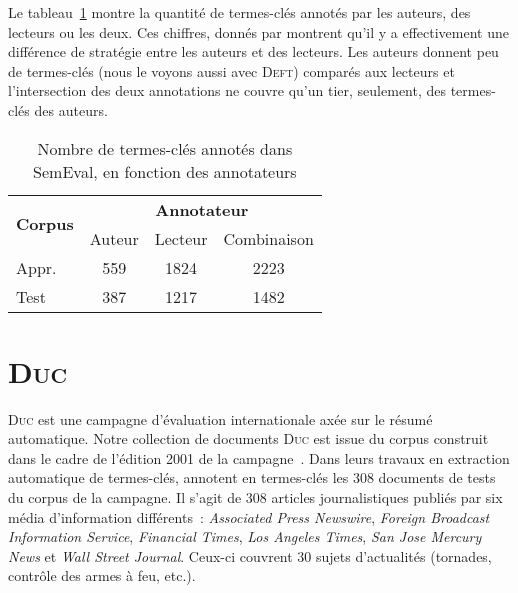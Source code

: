     Le tableau~\ref{tab:semeval_annotators} montre la quantité de termes-clés
    annotés par les auteurs, des lecteurs ou les deux. Ces chiffres, donnés par
     montrent qu'il y a effectivement une différence de
    stratégie entre les auteurs et des lecteurs. Les auteurs donnent peu de
    termes-clés (nous le voyons aussi avec \textsc{Deft}) comparés aux lecteurs
    et l'intersection des deux annotations ne couvre qu'un tier, seulement, des
    termes-clés des auteurs. 

    \begin{table}[!h]
      \centering
      \begin{tabular}{l|ccc}
        \toprule
        \multirow{2}{*}{\textbf{Corpus}} & \multicolumn{3}{c}{\textbf{Annotateur}}\\
        \cline{2-4}
        & Auteur & Lecteur & Combinaison\\
        \hline
        \hfill{}Appr. & 559 & 1824 & 2223\\
        \hfill{}Test & 387 & 1217 & 1482\\
        \bottomrule
      \end{tabular}

      \caption{Nombre de termes-clés annotés dans SemEval, en fonction des
               annotateurs
               \label{tab:semeval_annotators}}
    \end{table}


  \section[\textsc{Duc}]{\textsc{Duc}~\textnormal{\large\cite{wan2008expandrank}}}
  \label{sec:main-data_description-duc_data}
    \textsc{Duc} est une campagne d'évaluation internationale axée sur le résumé
    automatique. Notre collection de documents \textsc{Duc} est issue du corpus
    construit dans le cadre de l'édition 2001 de la campagne~\cite{over2001duc}.
    Dans leurs travaux en extraction automatique de termes-clés,
     annotent en termes-clés les 308 documents de
    tests du corpus de la campagne. Il s'agit de 308 articles journalistiques
    publiés par six média d'information différents~: \textit{Associated Press
    Newswire}, \textit{Foreign Broadcast Information Service}, \textit{Financial
    Times}, \textit{Los Angeles Times}, \textit{San Jose Mercury News} et
    \textit{Wall Street Journal}. Ceux-ci couvrent 30 sujets d'actualités
    (tornades, contrôle des armes à feu, etc.).
    
